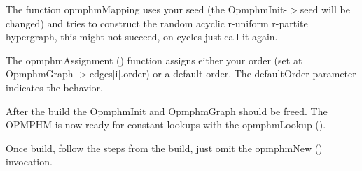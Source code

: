The function {\ttfamily opmphm\+Mapping} uses your seed (the {\ttfamily Opmphm\+Init-\/$>$seed} will be changed) and tries to construct the random acyclic r-\/uniform r-\/partite hypergraph, this might not succeed, on cycles just call it again.

The {\ttfamily opmphm\+Assignment ()} function assigns either your order (set at {\ttfamily Opmphm\+Graph-\/$>$edges\mbox{[}i\mbox{]}.order}) or a default order. The {\ttfamily default\+Order} parameter indicates the behavior.

After the build the Opmphm\+Init and Opmphm\+Graph should be freed. The O\+P\+M\+P\+HM is now ready for constant lookups with the {\ttfamily opmphm\+Lookup ()}.

Once build, follow the steps from the build, just omit the {\ttfamily opmphm\+New ()} invocation. 